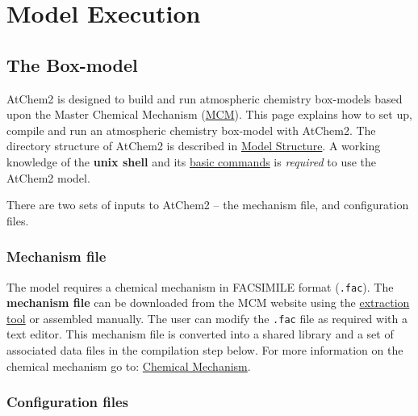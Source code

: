 %
%
%
%
\chapter{Model Execution} \label{ch:execution}

\section{The Box-model} \label{sec:boxmodel}

AtChem2 is designed to build and run atmospheric chemistry box-models
based upon the Master Chemical Mechanism
(\href{http://mcm.leeds.ac.uk/MCM/}{MCM}). This page explains how to
set up, compile and run an atmospheric chemistry box-model with
AtChem2. The directory structure of AtChem2 is described in
\hyperref[sec:structure]{Model Structure}. A working knowledge of the
\textbf{unix shell} and its
\href{https://swcarpentry.github.io/shell-novice/reference/}{basic
  commands} is \emph{required} to use the AtChem2 model.

There are two sets of inputs to AtChem2 -- the mechanism file, and
configuration files.

\subsection{Mechanism file} \label{subsec:mechanism-file}

The model requires a chemical mechanism in FACSIMILE format
(\texttt{.fac}). The \textbf{mechanism file} can be downloaded from
the MCM website using the
\href{http://mcm.leeds.ac.uk/MCMv3.3.1/extract.htt}{extraction tool}
or assembled manually. The user can modify the \texttt{.fac} file as
required with a text editor. This mechanism file is converted into a
shared library and a set of associated data files in the compilation
step below. For more information on the chemical mechanism go to:
\hyperref[sec:mechanism]{Chemical Mechanism}.

\subsection{Configuration files} \label{subsec:configuration-files}

